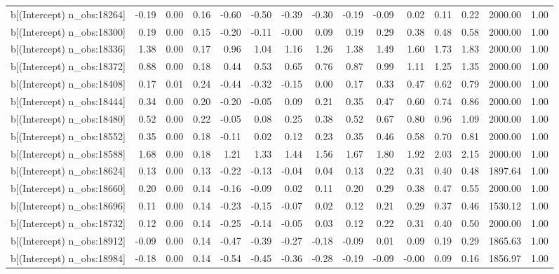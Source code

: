 \begin{table}[ht]
\begin{tabular}{rrrrrrrrrrrrrrr}
  b[(Intercept) n\_obs:18264] & -0.19 & 0.00 & 0.16 & -0.60 & -0.50 & -0.39 & -0.30 & -0.19 & -0.09 & 0.02 & 0.11 & 0.22 & 2000.00 & 1.00 \\ 
  b[(Intercept) n\_obs:18300] & 0.19 & 0.00 & 0.15 & -0.20 & -0.11 & -0.00 & 0.09 & 0.19 & 0.29 & 0.38 & 0.48 & 0.58 & 2000.00 & 1.00 \\ 
  b[(Intercept) n\_obs:18336] & 1.38 & 0.00 & 0.17 & 0.96 & 1.04 & 1.16 & 1.26 & 1.38 & 1.49 & 1.60 & 1.73 & 1.83 & 2000.00 & 1.00 \\ 
  b[(Intercept) n\_obs:18372] & 0.88 & 0.00 & 0.18 & 0.44 & 0.53 & 0.65 & 0.76 & 0.87 & 0.99 & 1.11 & 1.25 & 1.35 & 2000.00 & 1.00 \\ 
  b[(Intercept) n\_obs:18408] & 0.17 & 0.01 & 0.24 & -0.44 & -0.32 & -0.15 & 0.00 & 0.17 & 0.33 & 0.47 & 0.62 & 0.79 & 2000.00 & 1.00 \\ 
  b[(Intercept) n\_obs:18444] & 0.34 & 0.00 & 0.20 & -0.20 & -0.05 & 0.09 & 0.21 & 0.35 & 0.47 & 0.60 & 0.74 & 0.86 & 2000.00 & 1.00 \\ 
  b[(Intercept) n\_obs:18480] & 0.52 & 0.00 & 0.22 & -0.05 & 0.08 & 0.25 & 0.38 & 0.52 & 0.67 & 0.80 & 0.96 & 1.09 & 2000.00 & 1.00 \\ 
  b[(Intercept) n\_obs:18552] & 0.35 & 0.00 & 0.18 & -0.11 & 0.02 & 0.12 & 0.23 & 0.35 & 0.46 & 0.58 & 0.70 & 0.81 & 2000.00 & 1.00 \\ 
  b[(Intercept) n\_obs:18588] & 1.68 & 0.00 & 0.18 & 1.21 & 1.33 & 1.44 & 1.56 & 1.67 & 1.80 & 1.92 & 2.03 & 2.15 & 2000.00 & 1.00 \\ 
  b[(Intercept) n\_obs:18624] & 0.13 & 0.00 & 0.13 & -0.22 & -0.13 & -0.04 & 0.04 & 0.13 & 0.22 & 0.31 & 0.40 & 0.48 & 1897.64 & 1.00 \\ 
  b[(Intercept) n\_obs:18660] & 0.20 & 0.00 & 0.14 & -0.16 & -0.09 & 0.02 & 0.11 & 0.20 & 0.29 & 0.38 & 0.47 & 0.55 & 2000.00 & 1.00 \\ 
  b[(Intercept) n\_obs:18696] & 0.11 & 0.00 & 0.14 & -0.23 & -0.15 & -0.07 & 0.02 & 0.12 & 0.21 & 0.29 & 0.37 & 0.46 & 1530.12 & 1.00 \\ 
  b[(Intercept) n\_obs:18732] & 0.12 & 0.00 & 0.14 & -0.25 & -0.14 & -0.05 & 0.03 & 0.12 & 0.22 & 0.31 & 0.40 & 0.50 & 2000.00 & 1.00 \\ 
  b[(Intercept) n\_obs:18912] & -0.09 & 0.00 & 0.14 & -0.47 & -0.39 & -0.27 & -0.18 & -0.09 & 0.01 & 0.09 & 0.19 & 0.29 & 1865.63 & 1.00 \\ 
  b[(Intercept) n\_obs:18984] & -0.18 & 0.00 & 0.14 & -0.54 & -0.45 & -0.36 & -0.28 & -0.19 & -0.09 & -0.00 & 0.09 & 0.16 & 1856.97 & 1.00 \\ 

\end{tabular}
\end{table}
